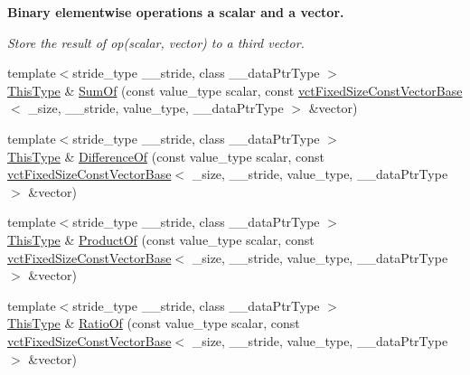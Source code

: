 \begin{Indent}{\bf Binary elementwise operations a scalar and a vector.}\par
{\em Store the result of op(scalar, vector) to a third vector. }\begin{DoxyCompactItemize}
\item 
{\footnotesize template$<$stride\+\_\+type \+\_\+\+\_\+stride, class \+\_\+\+\_\+data\+Ptr\+Type $>$ }\\\hyperlink{classvct_fixed_size_const_vector_base_a071063bc4fa43112cc287b2dbef53180}{This\+Type} \& \hyperlink{classvct_fixed_size_vector_base_a04ba8543a8e7786ccd119a013a3e93e8}{Sum\+Of} (const value\+\_\+type scalar, const \hyperlink{classvct_fixed_size_const_vector_base}{vct\+Fixed\+Size\+Const\+Vector\+Base}$<$ \+\_\+size, \+\_\+\+\_\+stride, value\+\_\+type, \+\_\+\+\_\+data\+Ptr\+Type $>$ \&vector)
\item 
{\footnotesize template$<$stride\+\_\+type \+\_\+\+\_\+stride, class \+\_\+\+\_\+data\+Ptr\+Type $>$ }\\\hyperlink{classvct_fixed_size_const_vector_base_a071063bc4fa43112cc287b2dbef53180}{This\+Type} \& \hyperlink{classvct_fixed_size_vector_base_a0a91cb0cf2913f1b1dc6f986cf058355}{Difference\+Of} (const value\+\_\+type scalar, const \hyperlink{classvct_fixed_size_const_vector_base}{vct\+Fixed\+Size\+Const\+Vector\+Base}$<$ \+\_\+size, \+\_\+\+\_\+stride, value\+\_\+type, \+\_\+\+\_\+data\+Ptr\+Type $>$ \&vector)
\item 
{\footnotesize template$<$stride\+\_\+type \+\_\+\+\_\+stride, class \+\_\+\+\_\+data\+Ptr\+Type $>$ }\\\hyperlink{classvct_fixed_size_const_vector_base_a071063bc4fa43112cc287b2dbef53180}{This\+Type} \& \hyperlink{classvct_fixed_size_vector_base_a91b42e6b52969fadaf6233f87378468e}{Product\+Of} (const value\+\_\+type scalar, const \hyperlink{classvct_fixed_size_const_vector_base}{vct\+Fixed\+Size\+Const\+Vector\+Base}$<$ \+\_\+size, \+\_\+\+\_\+stride, value\+\_\+type, \+\_\+\+\_\+data\+Ptr\+Type $>$ \&vector)
\item 
{\footnotesize template$<$stride\+\_\+type \+\_\+\+\_\+stride, class \+\_\+\+\_\+data\+Ptr\+Type $>$ }\\\hyperlink{classvct_fixed_size_const_vector_base_a071063bc4fa43112cc287b2dbef53180}{This\+Type} \& \hyperlink{classvct_fixed_size_vector_base_a5d06999aca9022a74e1ad6ac9d07b324}{Ratio\+Of} (const value\+\_\+type scalar, const \hyperlink{classvct_fixed_size_const_vector_base}{vct\+Fixed\+Size\+Const\+Vector\+Base}$<$ \+\_\+size, \+\_\+\+\_\+stride, value\+\_\+type, \+\_\+\+\_\+data\+Ptr\+Type $>$ \&vector)

\end{DoxyCompactItemize}
\end{Indent}
